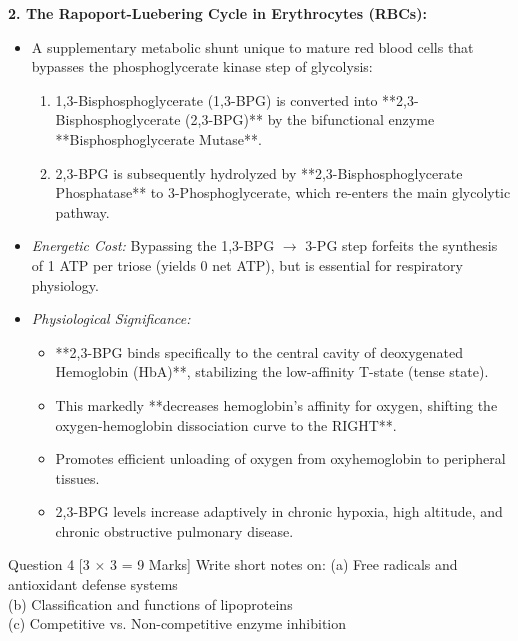 \documentclass[11pt,a4paper]{article}
\begin{document}
\begin{ansbox}
\textbf{2. The Rapoport-Luebering Cycle in Erythrocytes (RBCs):}
\begin{itemize}[leftmargin=*]
    \item A supplementary metabolic shunt unique to mature red blood cells that bypasses the phosphoglycerate kinase step of glycolysis:
    \begin{enumerate}
        \item 1,3-Bisphosphoglycerate (1,3-BPG) is converted into **2,3-Bisphosphoglycerate (2,3-BPG)** by the bifunctional enzyme **Bisphosphoglycerate Mutase**.
        \item 2,3-BPG is subsequently hydrolyzed by **2,3-Bisphosphoglycerate Phosphatase** to 3-Phosphoglycerate, which re-enters the main glycolytic pathway.
    \end{enumerate}
    \item \textit{Energetic Cost:} Bypassing the 1,3-BPG $\rightarrow$ 3-PG step forfeits the synthesis of 1 ATP per triose (yields 0 net ATP), but is essential for respiratory physiology.
    \item \textit{Physiological Significance:}
    \begin{itemize}
        \item **2,3-BPG binds specifically to the central cavity of deoxygenated Hemoglobin (HbA)**, stabilizing the low-affinity T-state (tense state).
        \item This markedly **decreases hemoglobin's affinity for oxygen, shifting the oxygen-hemoglobin dissociation curve to the RIGHT**.
        \item Promotes efficient unloading of oxygen from oxyhemoglobin to peripheral tissues.
        \item 2,3-BPG levels increase adaptively in chronic hypoxia, high altitude, and chronic obstructive pulmonary disease.
    \end{itemize}
\end{itemize}
\end{ansbox}

\begin{qbox}{Question 4 [3 $\times$ 3 = 9 Marks]}
Write short notes on:
(a) Free radicals and antioxidant defense systems \\
(b) Classification and functions of lipoproteins \\
(c) Competitive vs. Non-competitive enzyme inhibition
\end{qbox}
\end{document}
